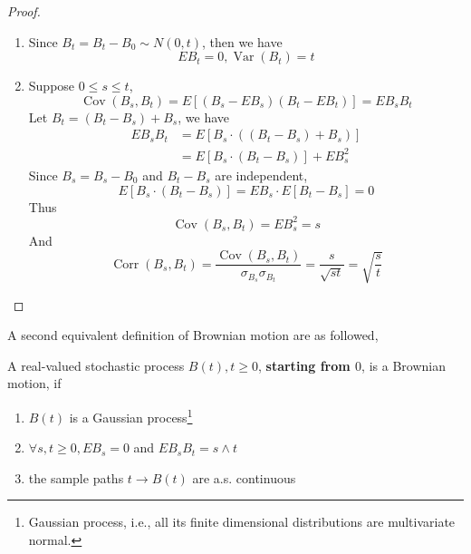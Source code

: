 \begin{proof}
    \begin{enumerate}
        \item Since $B_{t}=B_{t}-B_{0}\sim N(0, t)$, then we have
              \begin{equation*}
                  EB_{t}=0,\operatorname{Var}\left(B_{t}\right)=t
              \end{equation*}
        \item Suppose $0\leq s\leq t$,
              \begin{equation*}
                  \operatorname{Cov}\left(B_{s}, B_{t}\right)=E\left[\left(B_{s}-EB_{s}\right)\left(B_{t}-EB_{t}\right)\right]=EB_{s}B_{t}
              \end{equation*}
              Let $B_{t}=\left(B_{t}-B_{s}\right)+B_{s}$, we have
              \begin{equation*}
                  \begin{aligned}
                      EB_{s}B_{t} & =E\left[B_{s}\cdot\left(\left(B_{t}-B_{s}\right)+B_{s}\right)\right] \\
                                  & =E\left[B_{s}\cdot\left(B_{t}-B_{s}\right)\right]+EB_{s}^{2}
                  \end{aligned}
              \end{equation*}
              Since $B_{s}=B_{s}-B_{0}$ and $B_{t}-B_{s}$ are independent,
              \begin{equation*}
                  E\left[B_{s} \cdot\left(B_{t}-B_{s}\right)\right]=EB_{s} \cdot E\left[B_{t}-B_{s}\right]=0
              \end{equation*}
              Thus
              \begin{equation*}
                  \operatorname{Cov}\left(B_{s}, B_{t}\right)=EB_{s}^{2}=s
              \end{equation*}
              And
              \begin{equation*}
                  \operatorname{Corr}\left(B_{s},B_{t}\right)=\frac{\operatorname{Cov}\left(B_{s},B_{t}\right)}{\sigma_{B_{s}}\sigma_{B_{t}}}=\frac{s}{\sqrt{st}}=\sqrt{\frac{s}{t}}
              \end{equation*}
    \end{enumerate}
\end{proof}

A second equivalent definition of Brownian motion are as followed,

\begin{definition}
    A real-valued stochastic process $B(t),t\geq 0$, \textbf{starting from $0$}, is a Brownian motion, if
    \begin{enumerate}
        \item $B(t)$ is a Gaussian process\footnote{Gaussian process, i.e., all its finite dimensional distributions are multivariate normal.}
        \item $\forall s,t\geq 0,EB_{s}=0$ and $EB_{s}B_{t}=s\wedge t$
        \item the sample paths $t\rightarrow B(t)$ are a.s. continuous
    \end{enumerate}
\end{definition}

